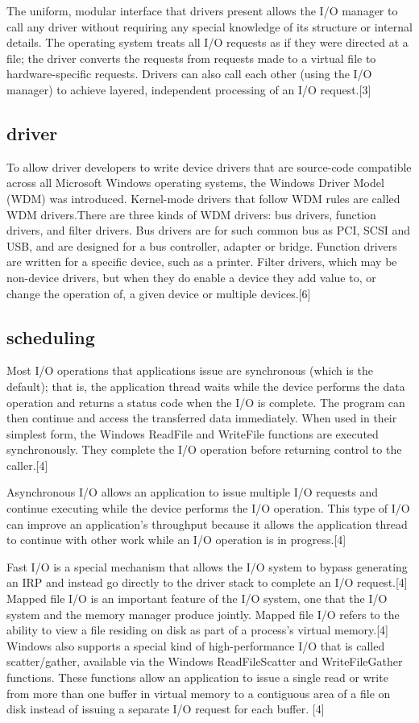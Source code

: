 \documentclass[onecolumn, draftclsnofoot,10pt, compsoc]{IEEEtran}
\begin{document}
The uniform, modular interface that drivers present allows the I/O manager to call any driver without requiring any special knowledge of its structure or internal details. The operating system treats all I/O requests as if they were directed at a file; the driver converts the requests from requests made to a virtual file to hardware-specific requests. Drivers can also call each other (using the I/O manager) to achieve layered, independent processing of an I/O request.[3]
\subsection{driver}

To allow driver developers to write device drivers that are source-code compatible across all Microsoft Windows operating systems, the Windows Driver Model (WDM) was introduced. Kernel-mode drivers that follow WDM rules are called WDM drivers.There are three kinds of WDM drivers: bus drivers, function drivers, and filter drivers. Bus drivers are for such common bus as PCI, SCSI and USB, and are designed for a bus controller, adapter or bridge. Function drivers are written for a specific device, such as a printer. Filter drivers, which may be non-device drivers, but when they do enable a device they add value to, or change the operation of, a given device or multiple devices.[6]

\subsection{scheduling}

Most I/O operations that applications issue are synchronous (which is the default); that is, the application thread waits while the device performs the data operation and returns a status code when the I/O is complete. The program can then continue and access the transferred data immediately. When used in their simplest form, the Windows ReadFile and WriteFile functions are executed synchronously. They complete the I/O operation before returning control to the caller.[4]

Asynchronous I/O allows an application to issue multiple I/O requests and continue executing while the device performs the I/O operation. This type of I/O can improve an application’s throughput because it allows the application thread to continue with other work while an I/O operation is in progress.[4]

Fast I/O is a special mechanism that allows the I/O system to bypass generating an IRP and instead go directly to the driver stack to complete an I/O request.[4]
Mapped file I/O is an important feature of the I/O system, one that the I/O system and the memory manager produce jointly. Mapped file I/O refers to the ability to view a file residing on disk as part of a process’s virtual memory.[4]
Windows also supports a special kind of high-performance I/O that is called scatter/gather, available via the Windows ReadFileScatter and WriteFileGather functions. These functions allow an application to issue a single read or write from more than one buffer in virtual memory to a contiguous area of a file on disk instead of issuing a separate I/O request for each buffer. [4]
\end{document}
